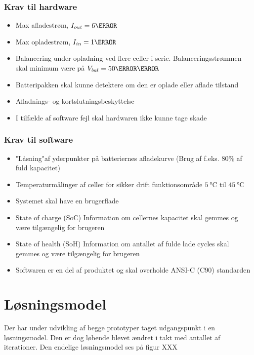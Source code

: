 \subsubsection{Krav til hardware}
\begin{itemize}[noitemsep]
	\item Max afladestrøm, $I_{out} = 6\ampere$
	\item Max opladestrøm, $I_{in} = 1\ampere$
	\item Balancering under opladning ved flere celler i serie. Balanceringsstrømmen skal minimum være på $V_{bal} = 50\milli\ampere$
	\item Batteripakken skal kunne detektere om den er oplade eller aflade tilstand
	\item Afladnings- og kortslutningsbeskyttelse
	\item I tilfælde af software fejl skal hardwaren ikke kunne tage skade
\end{itemize}

\subsubsection{Krav til software}
\begin{itemize}[noitemsep]
	\item "Låsning"\space af yderpunkter på batteriernes afladekurve (Brug af f.eks. 80\% af fuld kapacitet)
	\item Temperaturmålinger af celler for sikker drift \textemdash \space funktionsområde $\SI{5}{\celsius}$ til $\SI{45}{\celsius}$
	\item Systemet skal have en brugerflade
	\item State of charge (SoC) \textemdash \space Information om cellernes kapacitet skal gemmes og være tilgængelig for brugeren
	\item State of health (SoH) \textemdash \space Information om antallet af fulde lade cycles skal gemmes og være tilgængelig for brugeren
	\item Softwaren er en del af produktet og skal overholde ANSI-C (C90) standarden
\end{itemize}


\section{Løsningsmodel}
Der har under udvikling af begge prototyper taget udgangspunkt i en løsningsmodel. Den er dog løbende blevet ændret i takt med antallet af iterationer. Den endelige løsningsmodel ses på figur XXX

